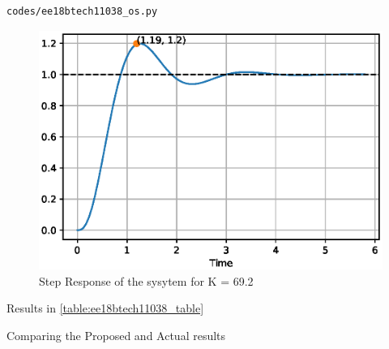 \begin{lstlisting}
codes/ee18btech11038_os.py
\end{lstlisting}

\begin{figure}[!h]
\centering
\includegraphics[width=\columnwidth]{./figs/ee18btech11038_os.eps}
\caption{Step Response of the sysytem for K = 69.2}
\label{fig:ee18btech11038_os}
\end{figure}
Results in \ref{table:ee18btech11038_table}
\begin{table}[!ht]
\centering

\caption{Comparing the Proposed and Actual results}
\label{table:ee18btech11038_table}
\end{table}
